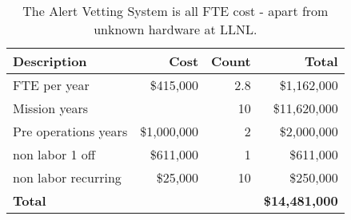 \tiny \begin{longtable} {|l|r|r|r|} \caption{The Alert Vetting System is all FTE cost - apart from unknown hardware at LLNL. \label{tab:eliminate}}\\ 
\hline 
\textbf{Description}&\textbf{Cost}&\textbf{Count}&\textbf{Total} \\ \hline
{FTE per year}&{\$415,000}&{2.8}&{\$1,162,000} \\ \hline
{Mission years}&{}&{10}&{\$11,620,000} \\ \hline
{Pre operations years}&{\$1,000,000}&{2}&{\$2,000,000} \\ \hline
{non labor 1 off}&{\$611,000}&{1}&{\$611,000} \\ \hline
{non labor recurring}&{\$25,000}&{10}&{\$250,000} \\ \hline
\textbf{Total }&\textbf{}&\textbf{}&\textbf{\$14,481,000} \\ \hline
\end{longtable} \normalsize
